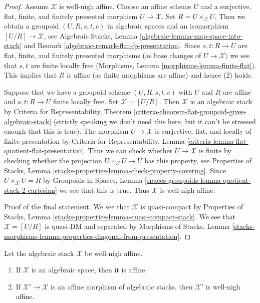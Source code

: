 \begin{proof}
Assume $\mathcal{X}$ is well-nigh affine. Choose an affine scheme $U$
and a surjective, flat, finite, and finitely presented morphism
$U \to \mathcal{X}$. Set $R = U \times_\mathcal{X} U$. Then we
obtain a groupoid $(U, R, s, t, c)$ in algebraic spaces and an
isomorphism $[U/R] \to \mathcal{X}$, see
Algebraic Stacks, Lemma \ref{algebraic-lemma-map-space-into-stack}
and Remark \ref{algebraic-remark-flat-fp-presentation}.
Since $s, t : R \to U$ are 
flat, finite, and finitely presented morphisms
(as base changes of $U \to \mathcal{X})$ we see that
$s, t$ are finite locally free
(Morphisms, Lemma \ref{morphisms-lemma-finite-flat}).
This implies that $R$ is affine (as finite morphisms are affine)
and hence (2) holds.

\medskip\noindent
Suppose that we have a groupoid scheme $(U, R, s, t, c)$ with $U$ and
$R$ are affine and $s, t : R \to U$ finite locally free.
Set $\mathcal{X} = [U/R]$. Then $\mathcal{X}$ is an algebraic stack
by Criteria for Representability, Theorem
\ref{criteria-theorem-flat-groupoid-gives-algebraic-stack} (strictly speaking
we don't need this here, but it can't be stressed enough that this is true).
The morphism $U \to \mathcal{X}$ is surjective, flat, and locally
of finite presentation by
Criteria for Representability, Lemma
\ref{criteria-lemma-flat-quotient-flat-presentation}.
Thus we can check whether $U \to \mathcal{X}$ is finite by
checking whether the projection $U \times_\mathcal{X} U \to U$
has this property, see Properties of Stacks, Lemma
\ref{stacks-properties-lemma-check-property-covering}.
Since $U \times_\mathcal{X} U = R$ by
Groupoids in Spaces, Lemma
\ref{spaces-groupoids-lemma-quotient-stack-2-cartesian}
we see that this is true. Thus $\mathcal{X}$ is well-nigh affine.

\medskip\noindent
Proof of the final statement. We see that $\mathcal{X}$
is quasi-compact by Properties of Stacks, Lemma
\ref{stacks-properties-lemma-quasi-compact-stack}.
We see that $\mathcal{X} = [U/R]$ is quasi-DM and separated by
Morphisms of Stacks, Lemma
\ref{stacks-morphisms-lemma-properties-diagonal-from-presentation}.
\end{proof}

\begin{lemma}
\label{lemma-affine-over-well-nigh-affine}
Let the algebraic stack $\mathcal{X}$ be well-nigh affine.
\begin{enumerate}
\item If $\mathcal{X}$ is an algebraic space, then it is affine.
\item If $\mathcal{X}' \to \mathcal{X}$ is an affine morphism
of algebraic stacks, then $\mathcal{X}'$ is well-nigh affine.
\end{enumerate}
\end{lemma}

